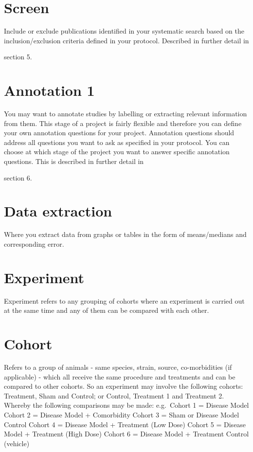 \documentclass[]{book}
\begin{document}
\section{Screen}\label{screen}

Include or exclude publications identified in your systematic search
based on the inclusion/exclusion criteria defined in your protocol.
Described in further detail in

section 5.

\section{Annotation 1}\label{annotation-1}

You may want to annotate studies by labelling or extracting relevant
information from them. This stage of a project is fairly flexible and
therefore you can define your own annotation questions for your project.
Annotation questions should address all questions you want to ask as
specified in your protocol. You can choose at which stage of the project
you want to answer specific annotation questions. This is described in
further detail in

section 6.

\section{Data extraction}\label{data-extraction}

Where you extract data from graphs or tables in the form of
means/medians and corresponding error.

\section{Experiment}\label{experiment}

Experiment refers to any grouping of cohorts where an experiment is
carried out at the same time and any of them can be compared with each
other.

\section{Cohort}\label{cohort}

Refers to a group of animals - same species, strain, source,
co-morbidities (if applicable) - which all receive the same procedure
and treatments and can be compared to other cohorts. So an experiment
may involve the following cohorts: Treatment, Sham and Control; or
Control, Treatment 1 and Treatment 2. Whereby the following comparisons
may be made: e.g.~Cohort 1 = Disease Model Cohort 2 = Disease Model +
Comorbidity Cohort 3 = Sham or Disease Model Control Cohort 4 = Disease
Model + Treatment (Low Dose) Cohort 5 = Disease Model + Treatment (High
Dose) Cohort 6 = Disease Model + Treatment Control (vehicle)
\end{document}
